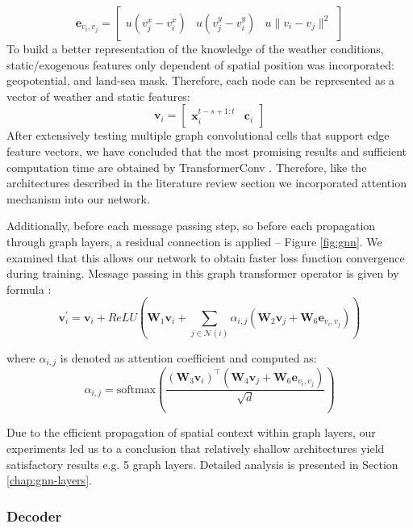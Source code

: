  \renewcommand{\arraystretch}{1}
\[
    \mathbf{e}_{v_i,v_j} =
    \begin{bmatrix}
        u(v_j^x - v_{i}^x) & u(v_j^y - v_i^y) & u\|v_{i}-v_{j}\|^2
    \end{bmatrix}
\]
To build a better representation of the knowledge of the weather conditions, static/exogenous features only dependent of spatial position was incorporated: geopotential, and land-sea mask. Therefore, each node can be represented as a vector of weather and static features:
\[
    \mathbf{v}_i = \begin{bmatrix}
        \mathbf{x}_i^{t-s+1:t} & \mathbf{c}_i
    \end{bmatrix}
\]
After extensively testing multiple graph convolutional cells that support edge feature vectors, we have concluded that the most promising results and sufficient computation time are obtained by TransformerConv \cite{dwivedi2021generalization} \cite{shi2021masked}. Therefore, like the architectures described in the literature review section we incorporated attention mechanism into our network.

Additionally, before each message passing step, so before each propagation through graph layers, a residual connection is applied -- Figure \ref{fig:gnn}. We examined that this allows our network to obtain faster loss function convergence during training. Message passing in this graph transformer operator is given by formula \cite{torch_geometric_transformerconv}:
\[
    \mathbf{v}^{\prime}_i = \mathbf{v}_i + ReLU(\mathbf{W}_1 \mathbf{v}_i +
    \sum_{j \in \mathcal{N}(i)} \alpha_{i,j} \left(
    \mathbf{W}_2 \mathbf{v}_{j} + \mathbf{W}_6 \mathbf{e}_{v_i, v_j}
    \right))
\]

where $\alpha_{i,j}$ is denoted as attention coefficient and computed as:
\[
    \alpha_{i,j} = \textrm{softmax} \left(
    \frac{(\mathbf{W}_3\mathbf{v}_i)^{\top}
    (\mathbf{W}_4\mathbf{v}_j + \mathbf{W}_6 \mathbf{e}_{v_i, v_j})}
    {\sqrt{d}} \right)
\]

Due to the efficient propagation of spatial context within graph layers, our experiments led us to a conclusion that relatively shallow architectures yield satisfactory results e.g. 5 graph layers. Detailed analysis is presented in Section \ref{chap:gnn-layers}.


\subsubsection{Decoder}

